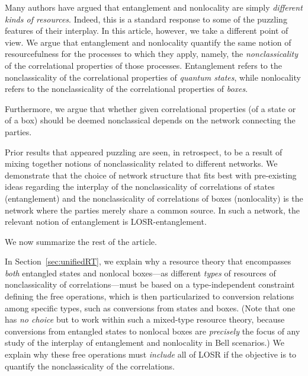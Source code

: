 \documentclass[12pt]{article}
\theoremstyle{plain}
\theoremstyle{definition}
\begin{document}
  
Many authors have argued that entanglement and nonlocality are simply {\em different kinds of resources}.  Indeed, this is a standard response to some of the puzzling features of their interplay.  
 In this article, however, we take a different point of view. 
We argue that entanglement and nonlocality quantify the same notion of resourcefulness
 for the processes to which they apply, namely, the  {\em nonclassicality} of the correlational properties of those processes.  Entanglement refers to the nonclassicality of the correlational properties of {\em quantum states}, while nonlocality refers to the nonclassicality of the correlational properties of {\em boxes}.

Furthermore, we argue that whether given correlational properties (of a state or of a box) should be deemed nonclassical depends on the network connecting the parties. 

Prior results that appeared puzzling are seen, in retrospect, to be a result of mixing together notions of nonclassicality related to different networks. 
 We demonstrate that the choice of network structure that fits best with pre-existing ideas regarding the interplay of the nonclassicality of correlations of states (entanglement) and the nonclassicality of correlations of boxes (nonlocality) is the network where the parties merely share a common source.  In such a network, the relevant notion of entanglement is LOSR-entanglement. 


We now summarize the rest of the article.   

In Section~\ref{sec:unifiedRT}, we explain why a resource theory that  encompasses {\em both} entangled states and nonlocal boxes---as different {\em types} of resources of nonclassicality of correlations---must be based on a type-independent constraint defining the free operations, which is then particularized to conversion relations among specific types, such as conversions from states and boxes. 
  (Note that one has {\em no choice} but to work within such a  mixed-type resource theory,  because conversions from entangled states to nonlocal boxes are {\em precisely} the focus of any study of the interplay of entanglement and nonlocality in Bell scenarios.)   
We explain why these free operations must {\em include} all of LOSR if the objective is to quantify the nonclassicality of the correlations. 
\end{document}
